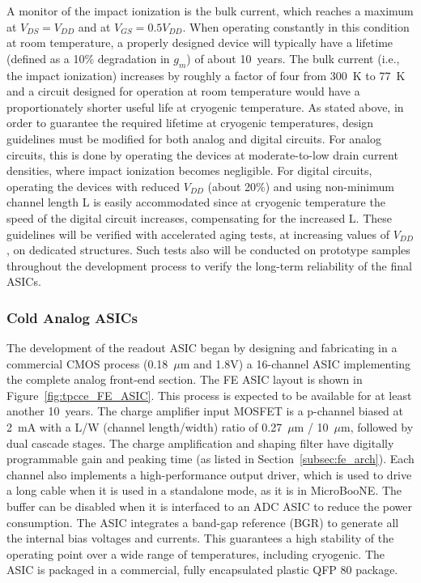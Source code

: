 A monitor of the impact ionization is the bulk current, which reaches a maximum at $V_{DS} = V_{DD}$ and at $V_{GS} = 0.5 V_{DD}$.
When operating constantly in this condition at room temperature, a properly designed device 
will typically have a lifetime (defined as a 10\% degradation in $g_m$) of about 10~years. 
The bulk current (i.e., the impact ionization) increases by roughly a factor of four from 300~K to 77~K 
and a circuit designed for operation at room temperature would have 
a proportionately shorter useful life at cryogenic temperature. As stated above, in order to guarantee 
the required lifetime at cryogenic temperatures, design guidelines must be modified for both analog 
and digital circuits. For analog circuits, this is done by operating the devices at moderate-to-low 
drain current densities, where impact ionization becomes negligible. 
%
For digital circuits, 
operating the devices with reduced $V_{DD}$ (about 20\%) and using non-minimum channel length L
is easily accommodated since at cryogenic temperature the speed of the digital circuit increases, 
compensating for the increased L.
%
These guidelines will be verified with accelerated aging tests, 
at increasing values of $V_{DD}$, on dedicated structures. Such tests also will be conducted on 
prototype samples throughout the development process to verify the long-term reliability of the final ASICs.

%
\subsubsection{Cold Analog ASICs}
\label{subsubsec:fe_CMOS_analog}

The development of the readout ASIC began by designing and fabricating in a commercial CMOS
process (0.18~$\mu$m and 1.8V) a 16-channel ASIC implementing the complete analog front-end section.
The FE ASIC layout is shown in Figure~\ref{fig:tpcce_FE_ASIC}.
This process is expected to be available for at least another 10~years. 
The charge amplifier input MOSFET is a p-channel biased at 2~mA with a L/W (channel length/width) ratio
of 0.27~$\mu$m / 10~$\mu$m, followed by dual cascade stages.
The charge amplification and shaping filter have digitally programmable gain and peaking time
(as listed in Section~\ref{subsec:fe_arch}).
Each channel also implements a high-performance output driver,
which is used to drive a long cable when it is used in a standalone mode, as it is in MicroBooNE.\cite{noise_filter}
The buffer can be disabled when it is interfaced to an ADC ASIC to reduce the power consumption.
The ASIC integrates a band-gap reference (BGR) to generate all the internal bias voltages and currents.
This guarantees a high stability of the operating point over a wide range of
temperatures, including cryogenic.
The ASIC is packaged in a commercial, fully encapsulated plastic QFP 80 package.

